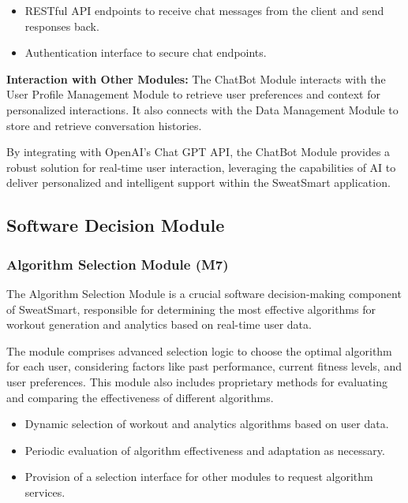 \documentclass[12pt, titlepage]{article}
\begin{document}
\begin{description}[leftmargin=0pt]
\item[Interfaces:]
\end{description}
\begin{itemize}[leftmargin=*]
\item RESTful API endpoints to receive chat messages from the client and send responses back.
\item Authentication interface to secure chat endpoints.
\end{itemize}

\textbf{Interaction with Other Modules:} 
The ChatBot Module interacts with the User Profile Management Module to retrieve user preferences and context for personalized interactions. It also connects with the Data Management Module to store and retrieve conversation histories.

By integrating with OpenAI's Chat GPT API, the ChatBot Module provides a robust solution for real-time user interaction, leveraging the capabilities of AI to deliver personalized and intelligent support within the SweatSmart application.



\subsection{Software Decision Module}

\subsubsection{Algorithm Selection Module (M7)}

The Algorithm Selection Module is a crucial software decision-making component of SweatSmart, responsible for determining the most effective algorithms for workout generation and analytics based on real-time user data.

\begin{description}[leftmargin=0pt]
\item[Secrets:]
The module comprises advanced selection logic to choose the optimal algorithm for each user, considering factors like past performance, current fitness levels, and user preferences. This module also includes proprietary methods for evaluating and comparing the effectiveness of different algorithms.
\end{description}

\begin{description}[leftmargin=0pt]
\item[Services:]
\end{description}
\begin{itemize}[leftmargin=*]
\item Dynamic selection of workout and analytics algorithms based on user data.
\item Periodic evaluation of algorithm effectiveness and adaptation as necessary.
\item Provision of a selection interface for other modules to request algorithm services.
\end{itemize}
\end{document}
